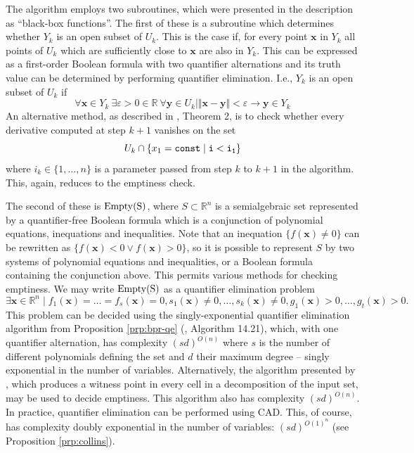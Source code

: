 \documentclass[
]{book}
\theoremstyle{definition}
\theoremstyle{definition}
\theoremstyle{definition}
\theoremstyle{definition}
\theoremstyle{remark}
\begin{document}
The algorithm employs two subroutines, which were presented in the description as ``black-box functions''.
The first of these is a subroutine which determines whether \(Y_k\) is an open subset of \(U_k\).
This is the case if, for every point \(\mathbf{x}\) in \(Y_k\) all points of \(U_k\) which are sufficiently close to \(\mathbf{x}\) are also in \(Y_k\).
This can be expressed as a first-order Boolean formula with two quantifier alternations and its truth value can be determined by performing quantifier elimination. I.e., \(Y_k\) is an open subset of \(U_k\) if
\[
\forall \mathbf{x} \in Y_k \> \exists \varepsilon > 0 \in \mathbb{R}\> \forall \mathbf{y} \in U_k \mid \Vert \mathbf{x} - \mathbf{y} \Vert < \varepsilon \rightarrow \mathbf{y} \in Y_k
\]
An alternative method, as described in \citet{gv1995}, Theorem 2, is to check whether every derivative computed at step \(k+1\) vanishes on the set
\[
U_k \cap \{ x_1 = \tt{const} \mid i < i_1 \}
\]
where \(i_k \in \{1,\ldots,n\}\) is a parameter passed from step \(k\) to \(k+1\) in the algorithm.
This, again, reduces to the emptiness check.

The second of these is \(\rm{Empty}(S)\), where \(S \subset \mathbb{R}^n\) is a semialgebraic set represented by a quantifier-free Boolean formula which is a conjunction of polynomial equations, inequations and inequalities. Note that an inequation \(\{ f(\mathbf{x}) \ne 0 \}\) can be rewritten as \(\{ f(\mathbf{x}) < 0 \lor f(\mathbf{x}) > 0 \}\), so it is possible to represent \(S\) by two systems of polynomial equations and inequalities, or a Boolean formula containing the conjunction above. This permits various methods for checking emptiness. We may write \(\rm{Empty}(S)\) as a quantifier elimination problem
\[
\exists \mathbf{x} \in \mathbb{R}^n \mid f_1(\mathbf{x}) = \ldots = f_s(\mathbf{x}) = 0, s_1(\mathbf{x}) \ne 0, \ldots, s_k(\mathbf{x}) \ne 0, g_1(\mathbf{x}) > 0, \ldots, g_t(\mathbf{x}) > 0.
\]
This problem can be decided using the singly-exponential quantifier elimination algorithm from Proposition \ref{prp:bpr-qe} (\citet{bpr2006}, Algorithm 14.21), which, with one quantifier alternation, has complexity \((sd)^{O(n)}\) where \(s\) is the number of different polynomials defining the set and \(d\) their maximum degree -- singly exponential in the number of variables. Alternatively, the algorithm presented by \citet{bpr98}, which produces a witness point in every cell in a decomposition of the input set, may be used to decide emptiness. This algorithm also has complexity \((sd)^{O(n)}\).
In practice, quantifier elimination can be performed using CAD. This, of course, has complexity doubly exponential in the number of variables: \((sd)^{O(1)^n}\) (see Proposition \ref{prp:collins}).
\end{document}
